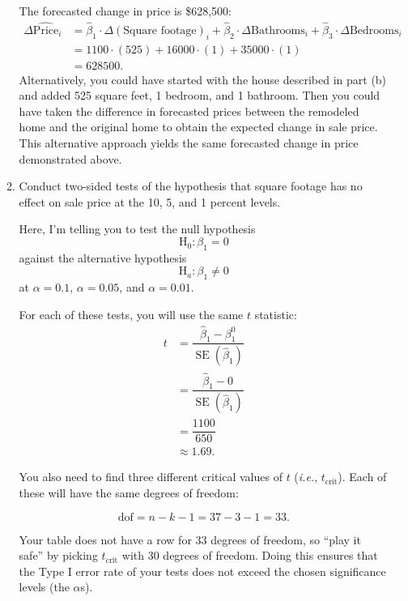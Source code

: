 \documentclass[11pt]{article}
\begin{document}
\begin{onehalfspacing}
\begin{enumerate}
\begin{enumerate}
		{\color{pine_green} The forecasted change in price is \$628,500:
		\begin{align*}
		\Delta\hat{\text{Price}}_i &= \hat{\beta}_1 \cdot \Delta (\text{Square footage})_i + \hat{\beta}_2 \cdot \Delta\text{Bathrooms}_i + \hat{\beta}_3 \cdot \Delta\text{Bedrooms}_i \\
		&= 1100 \cdot(525) + 16000 \cdot (1) + 35000 \cdot (1) \\
		&= 628500.
		\end{align*}
		Alternatively, you could have started with the house described in part (b) and added 525 square feet, 1 bedroom, and 1 bathroom. Then you could have taken the difference in forecasted prices between the remodeled home and the original home to obtain the expected change in sale price. This alternative approach yields the same forecasted change in price demonstrated above.\\
	}
	
	\item Conduct two-sided tests of the hypothesis that square footage has no effect on sale price at the 10, 5, and 1 percent levels.\\
	
	{\color{pine_green} Here, I'm telling you to test the null hypothesis 
		$$\text{H}_0: \beta_1 = 0$$ 
		against the alternative hypothesis 
		$$\text{H}_a: \beta_1 \neq 0$$ 
		at $\alpha = 0.1$, $\alpha = 0.05$, and $\alpha = 0.01$.
		
		For each of these tests, you will use the same $t$ statistic:
		\begin{align*}
		t &= \dfrac{\hat{\beta}_1 - \beta_1^0}{\mathop{\text{SE}}(\hat{\beta}_1)} \\
		&= \dfrac{\hat{\beta}_1 - 0}{\mathop{\text{SE}}(\hat{\beta}_1)} \\
		&= \dfrac{1100}{650} \\
		&\approx 1.69.
		\end{align*}
		
		You also need to find three different critical values of $t$ (\textit{i.e.}, $t_{\text{crit}}$). Each of these will have the same degrees of freedom:
		
		$$\text{dof} = n - k - 1 = 37 - 3 - 1 = 33.$$
		
		Your table does not have a row for 33 degrees of freedom, so ``play it safe'' by picking $t_{\text{crit}}$ with 30 degrees of freedom. Doing this ensures that the Type I error rate of your tests does not exceed the chosen significance levels (the $\alpha$s).
		
}
\end{enumerate}
\end{enumerate}
\end{onehalfspacing}
\end{document}
